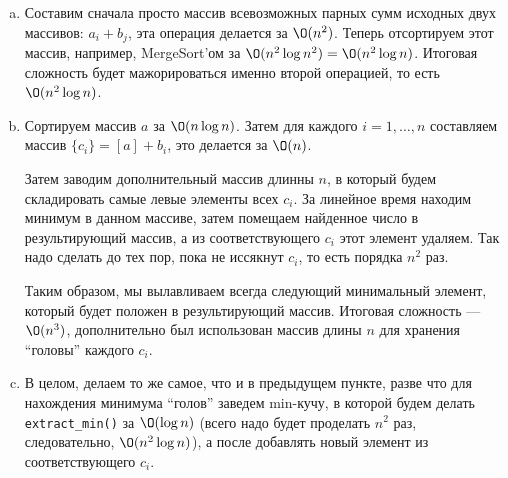 \begin{solution}
\begin{enumerate}[a)]
    \item Составим сначала просто массив всевозможных парных сумм исходных двух массивов: ${a_i+b_j}$, эта операция делается за $\O(n^2)$. Теперь отсортируем этот массив, например, MergeSort'ом за $\O(n^2\log n^2) = \O(n^2\log n)$. Итоговая сложность будет мажорироваться именно второй операцией, то есть $\O(n^2\log n)$.

    \item Сортируем массив $a$ за $\O(n\log n)$. Затем для каждого $i=1,\ldots,n$ составляем массив $\{c_i\} = [a] + b_i$, это делается за $\O(n)$.
    
    Затем заводим дополнительный массив длинны $n$, в который будем складировать самые левые элементы всех $c_i$. За линейное время находим минимум в данном массиве, затем помещаем найденное число в результирующий массив, а из соответствующего $c_i$ этот элемент удаляем. Так надо сделать до тех пор, пока не иссякнут $c_i$, то есть порядка $n^2$ раз.

    Таким образом, мы вылавливаем всегда следующий минимальный элемент, который будет положен в результирующий массив. Итоговая сложность --- $\O(n^3)$, дополнительно был использован массив длины $n$ для хранения ``головы'' каждого $c_i$.

    \item В целом, делаем то же самое, что и в предыдущем пункте, разве что для нахождения минимума ``голов'' заведем min-кучу, в которой будем делать \texttt{extract\_min()} за $\O(\log n)$ (всего надо будет проделать $n^2$ раз, следовательно, $\O(n^2\log n)$), а после добавлять новый элемент из соответствующего $c_i$.
    

\end{enumerate}
\end{solution}
